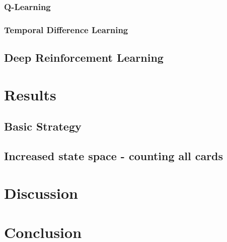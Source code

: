 \documentclass[conference]{IEEEtran}
\begin{document}
\subsubsection{Q-Learning}
\subsubsection{Temporal Difference Learning}


\subsection{Deep Reinforcement Learning}




\section{Results}

\subsection{Basic Strategy}

\subsection{Increased state space - counting all cards}

\section{Discussion}


\section{Conclusion}
\end{document}
